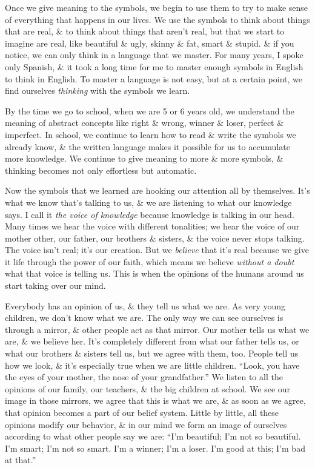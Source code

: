 \documentclass{article}
\numberwithin{equation}{section}
\begin{document}
Once we give meaning to the symbols, we begin to use them to try to make sense of everything that happens in our lives. We use the symbols to think about things that are real, \& to think about things that aren't real, but that we start to imagine are real, like beautiful \& ugly, skinny \& fat, smart \& stupid. \& if you notice, we can only think in a language that we master. For many years, I spoke only Spanish, \& it took a long time for me to master enough symbols in English to think in English. To master a language is not easy, but at a certain point, we find ourselves \textit{thinking} with the symbols we learn.

By the time we go to school, when we are 5 or 6 years old, we understand the meaning of abstract concepts like right \& wrong, winner \& loser, perfect \& imperfect. In school, we continue to learn how to read \& write the symbols we already know, \& the written language makes it possible for us to accumulate more knowledge. We continue to give meaning to more \& more symbols, \& thinking becomes not only effortless but automatic.

Now the symbols that we learned are hooking our attention all by themselves. It's what we know that's talking to us, \& we are listening to what our knowledge says. I call it \textit{the voice of knowledge} because knowledge is talking in our head. Many times we hear the voice with different tonalities; we hear the voice of our mother other, our father, our brothers \& sisters, \& the voice never stops talking. The voice isn't real; it's our creation. But we \textit{believe} that it's real because we give it life through the power of our faith, which means we believe \textit{without a doubt} what that voice is telling us. This is when the opinions of the humans around us start taking over our mind.

Everybody has an opinion of us, \& they tell us what we are. As very young children, we don't know what we are. The only way we can see ourselves is through a mirror, \& other people act as that mirror. Our mother tells us what we are, \& we believe her. It's completely different from what our father tells us, or what our brothers \& sisters tell us, but we agree with them, too. People tell us how we look, \& it's especially true when we are little children. ``Look, you have the eyes of your mother, the nose of your grandfather.'' We listen to all the opinions of our family, our teachers, \& the big children at school. We see our image in those mirrors, we agree that this is what we are, \& as soon as we agree, that opinion becomes a part of our belief system. Little by little, all these opinions modify our behavior, \& in our mind we form an image of ourselves according to what other people say we are: ``I'm beautiful; I'm not so beautiful. I'm smart; I'm not so smart. I'm a winner; I'm a loser. I'm good at this; I'm bad at that.''
\end{document}
